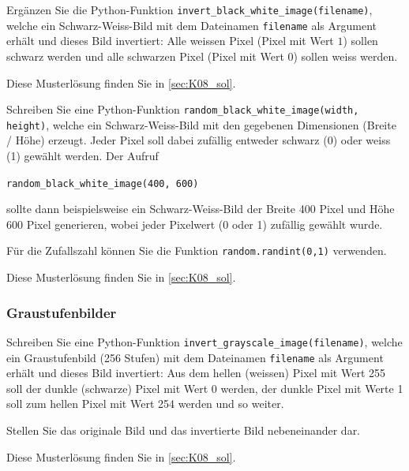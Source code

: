 \begin{myexercise}
	Ergänzen Sie die Python-Funktion \lstinline|invert_black_white_image(filename)|, welche ein Schwarz-Weiss-Bild mit dem Dateinamen \lstinline|filename| als Argument erhält und dieses Bild invertiert: Alle weissen Pixel (Pixel mit Wert \(1\)) sollen schwarz werden und alle schwarzen Pixel (Pixel mit Wert \(0\)) sollen weiss werden.

	\begin{myanswer}
		Diese Musterlösung finden Sie in \cref{sec:K08_sol}.
	\end{myanswer}
\end{myexercise}

\begin{myexercise}
	Schreiben Sie eine Python-Funktion \lstinline|random_black_white_image(width, height)|, welche ein Schwarz-Weiss-Bild mit den gegebenen Dimensionen (Breite / Höhe) erzeugt.
	Jeder Pixel soll dabei zufällig entweder schwarz (0) oder weiss (1) gewählt werden. Der Aufruf
	\begin{center}
		\lstinline|random_black_white_image(400, 600)|
	\end{center}
	sollte dann beispielsweise ein Schwarz-Weiss-Bild der Breite 400 Pixel und Höhe 600 Pixel generieren, wobei jeder Pixelwert (0 oder 1) zufällig gewählt wurde.

	Für die Zufallszahl können Sie die Funktion \lstinline|random.randint(0,1)| verwenden.
	\begin{myanswer}
		Diese Musterlösung finden Sie in \cref{sec:K08_sol}.
	\end{myanswer}
\end{myexercise}

\subsubsection{Graustufenbilder}
\begin{myexercise}
	Schreiben Sie eine Python-Funktion \lstinline|invert_grayscale_image(filename)|, welche ein Graustufenbild (256 Stufen) mit dem Dateinamen \lstinline|filename| als Argument erhält und dieses Bild invertiert: Aus dem hellen (weissen) Pixel mit Wert 255 soll der dunkle (schwarze) Pixel mit Wert 0 werden, der dunkle Pixel mit Werte 1 soll zum hellen Pixel mit Wert 254 werden und so weiter.

	Stellen Sie das originale Bild und das invertierte Bild nebeneinander dar.
	\begin{myanswer}
		Diese Musterlösung finden Sie in \cref{sec:K08_sol}.
	\end{myanswer}
\end{myexercise}


